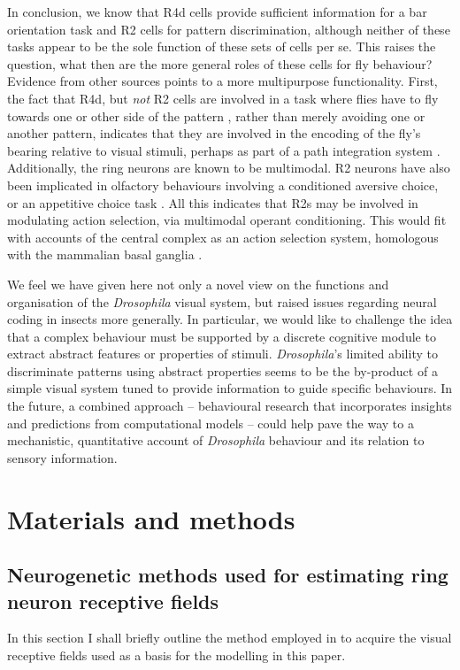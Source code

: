 \documentclass[10pt]{article}
\begin{document}
In conclusion, we know that R4d cells provide sufficient information for a bar orientation task and R2 cells for pattern discrimination, although neither of these tasks appear to be the sole function of these sets of cells per se.
This raises the question, what then are the more general roles of these cells for fly behaviour?
Evidence from other sources points to a more multipurpose functionality.
First, the fact that R4d, but \emph{not} R2 cells are involved in a task where flies have to fly towards one or other side of the pattern \cite{Guo2015}, rather than merely avoiding one or another pattern, indicates that they are involved in the encoding of the fly's bearing relative to visual stimuli, perhaps as part of a path integration system \cite{Seelig2015}.
Additionally, the ring neurons are known to be multimodal.
R2 neurons have also been implicated in olfactory behaviours involving a conditioned aversive choice, or an appetitive choice task \cite{Azanchi2013, Zhang2013,Zhang2015}. All this indicates that R2s may be involved in modulating action selection, via multimodal operant conditioning.
This would fit with accounts of the central complex as an action selection system, homologous with the mammalian basal ganglia \cite{Strausfeld2013}.

We feel we have given here not only a novel view on the functions and organisation of the \emph{Drosophila} visual system, but raised issues regarding neural coding in insects more generally. In particular, we would like to challenge the idea that a complex behaviour must be supported by a discrete cognitive module to extract abstract features or properties of stimuli.
\emph{Drosophila}'s limited ability to discriminate patterns using abstract properties seems to be the by-product of a simple visual system tuned to provide information to guide specific behaviours.
In the future, a combined approach -- behavioural research that incorporates insights and predictions from computational models -- could help pave the way to a mechanistic, quantitative account of \emph{Drosophila} behaviour and its relation to sensory information.


\section*{Materials and methods}

\subsection*{Neurogenetic methods used for estimating ring neuron receptive fields}
\label{sec:methods:seelig}
In this section I shall briefly outline the method employed in \cite{Seelig2013} to acquire the visual receptive fields used as a basis for the modelling in this paper.
\end{document}
